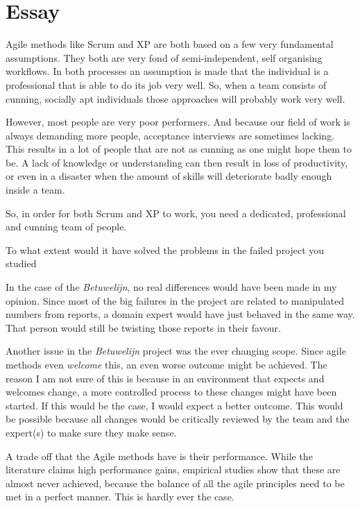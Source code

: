 \chapter{Essay}

Agile methods like Scrum and XP are both based on a few very fundamental assumptions.
They both are very fond of semi-independent, self organising workflows. 
In both processes an assumption is made that the individual is a professional that is able to do its job very well.
So, when a team consists of cunning, socially apt individuals those approaches will probably work very well. 

However, most people are very poor performers. 
And because our field of work is always demanding more people, acceptance interviews are sometimes lacking. 
This results in a lot of people that are not as cunning as one might hope them to be. 
A lack of knowledge or understanding can then result in loss of productivity, or even in a disaster when the amount of skills will deteriorate badly enough inside a team.

So, in order for both Scrum and XP to work, you need a dedicated, professional and cunning team of people.

To what extent would it have solved the problems in the failed project you studied

In the case of the \emph{Betuwelijn}, no real differences would have been made in my opinion. 
Since most of the big failures in the project are related to manipulated numbers from reports, a domain expert would have just behaved in the same way. That person would still be twisting those reports in their favour. 

Another issue in the \emph{Betuwelijn} project was the ever changing scope. Since agile methods even \emph{welcome} this, an even worse outcome might be achieved. The reason I am not sure of this is because in an environment that expects and welcomes change, a more controlled process to these changes might have been started. If this would be the case, I would expect a better outcome. This would be possible because all changes would be critically reviewed by the team and the expert(s) to make sure they make sense.

A trade off that the Agile methods have is their performance. 
While the literature claims high performance gains, empirical studies show that these are almost never achieved, because the balance of all the agile principles need to be met in a perfect manner. This is hardly ever the case. 

